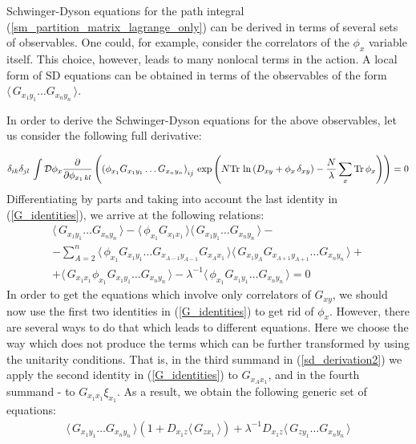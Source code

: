 \documentclass[twocolumn,showpacs,preprintnumbers,superscriptaddress,amsmath,floatfix,amssymb,secnumarabic]{revtex4}
\newcommand{\lr}[1]{ \left( #1 \right) }
\newcommand{\vev}[1]{ \langle \, #1 \, \rangle }
\newcommand{\tr}{ {\rm Tr} \, }
\newcommand{\expa}[1]{ \exp{\left( #1 \right)} }
\begin{document}
 Schwinger-Dyson equations for the path integral (\ref{sm_partition_matrix_lagrange_only}) can be derived in terms of several sets of observables. One could, for example, consider the correlators of the $\phi_x$ variable itself. This choice, however, leads to many nonlocal terms in the action. A local form of SD equations can be obtained in terms of the observables of the form $\vev{G_{x_1 y_1} \ldots G_{x_n y_n}}$.

 In order to derive the Schwinger-Dyson equations for the above observables, let us consider the following full derivative:
\begin{widetext}
\begin{eqnarray}
\label{sd_derivation1}
 \delta_{ik} \delta_{jl} \, \int\mathcal{D}\phi_x \frac{\partial}{\partial \phi_{x_1 \, kl}}
 \lr{ \lr{\phi_{x_1} G_{x_1 y_1} \ldots G_{x_n y_n}}_{ij} \,
 \expa{N \tr\ln\lr{D_{xy} + \phi_x \, \delta_{xy}} - \frac{N}{\lambda} \sum\limits_x \tr \phi_x } } = 0
\end{eqnarray}
Differentiating by parts and taking into account the last identity in (\ref{G_identities}), we arrive at the following relations:
\begin{eqnarray}
\label{sd_derivation2}
 \vev{G_{x_1 y_1} \ldots G_{x_n y_n}} - \vev{\phi_{x_1} G_{x_1 x_1}} \vev{G_{x_1 y_1} \ldots G_{x_n y_n}}
 - \nonumber \\ -
 \sum\limits_{A=2}^{n} \vev{\phi_{x_1} G_{x_1 y_1} \ldots G_{x_{A-1}y_{A-1}} G_{x_A x_1}} \vev{G_{x_1 y_A} G_{x_{A+1}y_{A+1}} \ldots G_{x_n y_n}}
 + \nonumber \\ +
 \vev{G_{x_1 x_1} \phi_{x_1} G_{x_1 y_1} \ldots G_{x_n y_n}}
 - \lambda^{-1} \vev{\phi_{x_1} G_{x_1 y_1} \ldots G_{x_n y_n} } = 0
\end{eqnarray}
In order to get the equations which involve only correlators of $G_{x y}$, we should now use the first two identities in (\ref{G_identities}) to get rid of $\phi_x$. However, there are several ways to do that which leads to different equations. Here we choose the way which does not produce the terms which can be further transformed by using the unitarity conditions. That is, in the third summand in (\ref{sd_derivation2}) we apply the second identity in (\ref{G_identities}) to $G_{x_A x_1}$, and in the fourth summand - to $G_{x_1 x_1} \xi_{x_1}$. As a result, we obtain the following generic set of equations:
\begin{eqnarray}
\label{sd_G_general}
 \vev{ G_{x_1 y_1} \ldots G_{x_n y_n} } \lr{1 + D_{x_1 z} \vev{G_{z x_1}}}
 +
 \lambda^{-1} D_{x_1 z} \vev{G_{z y_1} \ldots G_{x_n y_n}}

\end{eqnarray}
\end{widetext}
\end{document}
